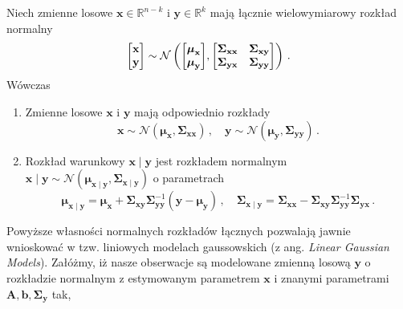 \documentclass{myclass}
\numberwithin{equation}{section}
\begin{document}
\begin{theorem}\label{th:gauss_model}
Niech zmienne losowe \(\mathbf{x} \in \mathbb{R}^{n-k}\) i \(\mathbf{y} \in \mathbb{R}^k\) mają
łącznie wielowymiarowy rozkład normalny
\begin{equation*}
    \mqty[\mathbf{x} \\ \mathbf{y}] \sim \mathcal{N}\left(\mqty[\boldsymbol{\mu}_\mathbf{x} \\ \boldsymbol{\mu}_\mathbf{y}], \mqty[\boldsymbol{\Sigma}_{\mathbf{xx}} & \boldsymbol{\Sigma}_{\mathbf{xy}} \\ \boldsymbol{\Sigma}_{\mathbf{yx}} & \boldsymbol{\Sigma}_{\mathbf{yy}}] \right)\,.
\end{equation*} 
Wówczas
\begin{enumerate}
    
    \item Zmienne losowe \(\mathbf{x}\) i \(\mathbf{y}\) mają odpowiednio rozkłady
    \begin{equation*}
        \mathbf{x} \sim \mathcal{N}(\boldsymbol{\mu}_\mathbf{x}, \boldsymbol{\Sigma}_{\mathbf{xx}})\,,\quad \mathbf{y} \sim \mathcal{N}(\boldsymbol{\mu}_\mathbf{y}, \boldsymbol{\Sigma}_{\mathbf{yy}})\,.
    \end{equation*}

    \item Rozkład warunkowy \(\mathbf{x} \mid \mathbf{y}\) jest rozkładem normalnym \(\mathbf{x}
    \mid \mathbf{y} \sim \mathcal{N}(\boldsymbol{\mu}_{\mathbf{x}\mid\mathbf{y}},
    \boldsymbol{\Sigma}_{\mathbf{x}\mid\mathbf{y}})\) o parametrach
    \begin{equation*}
        \boldsymbol{\mu}_{\mathbf{x}\mid\mathbf{y}} = \boldsymbol{\mu}_\mathbf{x} + \boldsymbol{\Sigma}_\mathbf{xy}\boldsymbol{\Sigma}_\mathbf{yy}^{-1}(\mathbf{y} - \boldsymbol{\mu}_\mathbf{y})\,,\quad \boldsymbol{\Sigma}_{\mathbf{x}\mid\mathbf{y}} = \boldsymbol{\Sigma}_\mathbf{xx} - \boldsymbol{\Sigma}_\mathbf{xy}\boldsymbol{\Sigma}_\mathbf{yy}^{-1}\boldsymbol{\Sigma}_\mathbf{yx}\,.
    \end{equation*}
\end{enumerate}
\end{theorem}
Powyższe własności normalnych rozkładów łącznych pozwalają jawnie wnioskować w tzw. liniowych
modelach gaussowskich (z ang. \textit{Linear Gaussian Models}). Załóżmy, iż nasze obserwacje są
modelowane zmienną losową \(\mathbf{y}\) o rozkładzie normalnym z estymowanym parametrem
\(\mathbf{x}\) i znanymi parametrami \(\mathbf{A}, \mathbf{b}, \boldsymbol{\Sigma}_\mathbf{y}\) tak,
\end{document}
